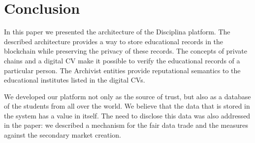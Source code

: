 \section{Conclusion}
In this paper we presented the architecture of the Disciplina platform. The described architecture provides a way to store educational records in the blockchain while preserving the privacy of these records. The concepts of private chains and a digital CV make it possible to verify the educational records of a particular person. The Archivist entities provide reputational semantics to the educational institutes listed in the digital CVs.

We developed our platform not only as the source of trust, but also as a database of the students from all over the world. We believe that the data that is stored in the system has a value in itself. The need to disclose this data was also addressed in the paper: we described a mechanism for the fair data trade and the measures against the secondary market creation.



